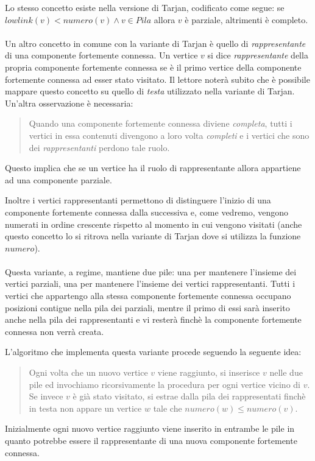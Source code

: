 Lo stesso concetto esiste nella versione di Tarjan, codificato come
segue: se $lowlink(v) < numero(v) \wedge v \in Pila$ allora $v$ \`e
parziale, altrimenti \`e completo.
\\\\
Un altro concetto in comune con la variante di Tarjan \`e quello di
\emph{rappresentante} di una componente fortemente connessa. Un
vertice $v$ si dice \emph{rappresentante} della propria componente
fortemente connessa se \`e il primo vertice della componente
fortemente connessa ad esser stato visitato. Il lettore noter\`a
subito che \`e possibile mappare questo concetto su quello di
\emph{testa} utilizzato nella variante di Tarjan. Un'altra
osservazione \`e necessaria:
\begin{quotation}
  Quando una componente fortemente connessa diviene \emph{completa},
  tutti i vertici in essa contenuti divengono a loro volta
  \emph{completi} e i vertici che sono dei \emph{rappresentanti}
  perdono tale ruolo.
\end{quotation}
Questo implica che se un vertice ha il ruolo di rappresentante allora
appartiene ad una componente parziale.

Inoltre i vertici rappresentanti permettono di distinguere l'inizio di
una componente fortemente connessa dalla successiva e, come vedremo,
vengono numerati in ordine crescente rispetto al momento in cui
vengono visitati (anche questo concetto lo si ritrova nella variante
di Tarjan dove si utilizza la funzione $numero$).
\\\\
Questa variante, a regime, mantiene due pile: una per mantenere
l'insieme dei vertici parziali, una per mantenere l'insieme dei
vertici rappresentanti. Tutti i vertici che appartengo alla stessa
componente fortemente connessa occupano posizioni contigue nella pila
dei parziali, mentre il primo di essi sar\`a inserito anche nella pila
dei rappresentanti e vi rester\`a finch\`e la componente fortemente
connessa non verr\`a creata.

L'algoritmo che implementa questa variante procede seguendo la
seguente idea:
\begin{quotation}
  Ogni volta che un nuovo vertice $v$ viene raggiunto, si inserisce
  $v$ nelle due pile ed invochiamo ricorsivamente la procedura per
  ogni vertice vicino di $v$. Se invece $v$ \`e gi\`a stato visitato,
  si estrae dalla pila dei rappresentati finch\`e in testa non appare
  un vertice $w$ tale che $numero(w) \leq numero(v)$.
\end{quotation}
Inizialmente ogni nuovo vertice raggiunto viene inserito in entrambe
le pile in quanto potrebbe essere il rappresentante di una nuova
componente fortemente connessa.

